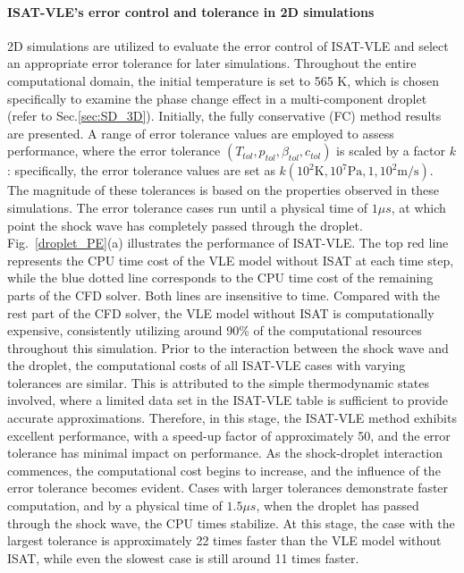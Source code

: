 \paragraph{ISAT-VLE's error control and tolerance in 2D simulations}
2D simulations are utilized to evaluate the error control of ISAT-VLE and select an appropriate error tolerance for later simulations. Throughout the entire computational domain, the initial temperature is set to 565 K, which is chosen specifically to examine the phase change effect in a multi-component droplet (refer to Sec.\ref{sec:SD_3D}). Initially, the fully conservative (FC) method results are presented. A range of error tolerance values are employed to assess performance, where the error tolerance $(T_{tol},p_{tol},\beta_{tol},c_{tol})$ is scaled by a factor $k$: specifically, the error tolerance values are set as $k (10^2 \text{K}, 10^7 \text{Pa}, 1, 10^2 \text{m/s})$. The magnitude of these tolerances is based on the properties observed in these simulations. The error tolerance cases run until a physical time of $1\mu s$, at which point the shock wave has completely passed through the droplet. Fig.~\ref{droplet_PE}(a) illustrates the performance of ISAT-VLE. The top red line represents the CPU time cost of the VLE model without ISAT at each time step, while the blue dotted line corresponds to the CPU time cost of the remaining parts of the CFD solver. Both lines are insensitive to time. Compared with the rest part of the CFD solver, the VLE model without ISAT is computationally expensive, consistently utilizing around 90\% of the computational resources throughout this simulation. Prior to the interaction between the shock wave and the droplet, the computational costs of all ISAT-VLE cases with varying tolerances are similar. This is attributed to the simple thermodynamic states involved, where a limited data set in the ISAT-VLE table is sufficient to provide accurate approximations. Therefore, in this stage, the ISAT-VLE method exhibits excellent performance, with a speed-up factor of approximately 50, and the error tolerance has minimal impact on performance. As the shock-droplet interaction commences, the computational cost begins to increase, and the influence of the error tolerance becomes evident. Cases with larger tolerances demonstrate faster computation, and by a physical time of $1.5 \mu s$, when the droplet has passed through the shock wave, the CPU times stabilize. At this stage, the case with the largest tolerance is approximately 22 times faster than the VLE model without ISAT, while even the slowest case is still around 11 times faster.

